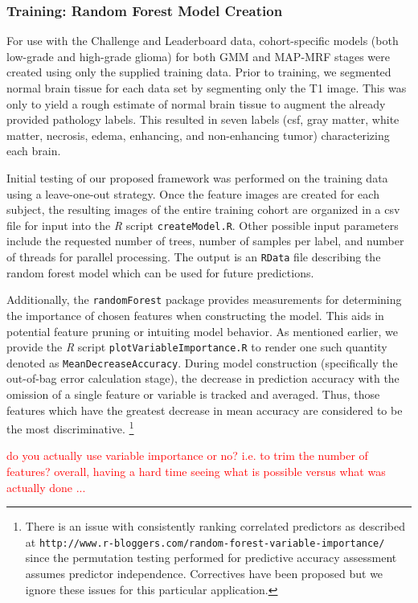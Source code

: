 \documentclass[final,5p,times,twocolumn]{elsarticle}
\begin{document}
\subsubsection{Training:  Random Forest Model Creation}

For use with the Challenge and Leaderboard data, cohort-specific models (both 
low-grade and 
high-grade glioma) for both GMM and MAP-MRF stages were created using only the 
supplied training data.  Prior to training, we segmented normal brain tissue \cite{avants2011}
for each data set by segmenting only the T1 image.  This was only to yield
a rough estimate of normal brain tissue to augment the already provided 
pathology labels.  This resulted in seven labels (csf, gray matter, white matter,
necrosis, edema, enhancing, and non-enhancing tumor)
characterizing each brain.

Initial testing of our proposed framework was performed 
on the training data using a leave-one-out strategy.  Once the
feature images are created for each subject, the resulting images of the entire
training cohort are organized in a csv file for input into the \textit{R} script
{\tt createModel.R}.  Other possible input parameters include the requested 
number of trees, number of samples per label, and number of threads for parallel
processing.  The output is an {\tt RData} file describing the random forest
model which can be used for future predictions.
 
Additionally, the {\tt randomForest} package provides  measurements 
for determining the importance of chosen features when constructing the model.  
This aids in potential feature pruning or intuiting model behavior.  As mentioned
earlier, we provide the \textit{R} script {\tt plotVariableImportance.R} to render
one such quantity denoted as {\tt MeanDecreaseAccuracy}.  During model construction
(specifically the out-of-bag error calculation stage), the decrease in prediction accuracy
with the omission of a single feature or variable is tracked and averaged.  Thus,
those features which have the greatest decrease in mean accuracy are considered
to be the most discriminative.%
\footnote{
There is an issue with consistently ranking correlated predictors as described at {\tt http://www.r-bloggers.com/random-forest-variable-importance/} since the permutation testing performed for predictive accuracy assessment assumes predictor independence.  Correctives have been proposed but we ignore these issues for this particular application.
}

\textcolor{red}{do you actually use variable importance or no?
  i.e. to trim the number of features?  overall, having a hard time
  seeing what is possible versus what was actually done ... }
\end{document}
